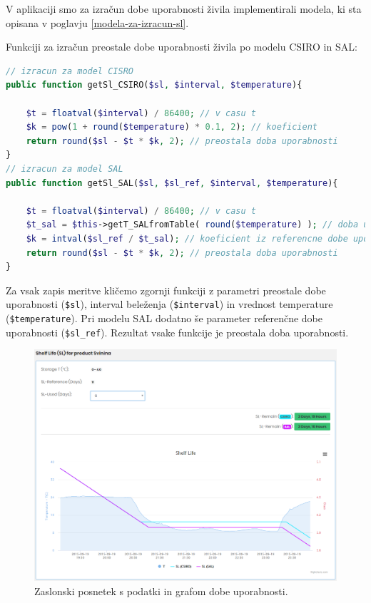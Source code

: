 \documentclass[a4paper, 12pt]{book}
\begin{document}
V aplikaciji smo za izračun dobe uporabnosti živila implementirali modela, ki sta opisana v poglavju \ref{modela-za-izracun-sl}.


Funkciji za izračun preostale dobe uporabnosti živila po modelu CSIRO in SAL:

\begin{lstlisting}[language=PHP, style=mystyle]
// izracun za model CISRO
public function getSl_CSIRO($sl, $interval, $temperature){

    $t = floatval($interval) / 86400; // v casu t
    $k = pow(1 + round($temperature) * 0.1, 2); // koeficient
    return round($sl - $t * $k, 2); // preostala doba uporabnosti
}
// izracun za model SAL
public function getSl_SAL($sl, $sl_ref, $interval, $temperature){

    $t = floatval($interval) / 86400; // v casu t
    $t_sal = $this->getT_SALfromTable( round($temperature) ); // doba uporabnosti pri temperaturi T prebrana iz tabele SAL
    $k = intval($sl_ref / $t_sal); // koeficient iz referencne dobe uporabnosti deljeno z $t_sal
    return round($sl - $t * $k, 2); // preostala doba uporabnosti
}
\end{lstlisting}

Za vsak zapis meritve kličemo zgornji funkciji z parametri preostale dobe uporabnosti (\verb=$sl=), interval beleženja (\verb=$interval=) in vrednost temperature (\verb=$temperature=). Pri modelu SAL dodatno še parameter referenčne dobe uporabnosti (\verb=$sl_ref=). Rezultat vsake funkcije je preostala doba uporabnosti.

\begin{figure}[h]
\begin{center}
\includegraphics[width=\textwidth]{slike/record_page_33.png}
\end{center}
\caption{Zaslonski posnetek s podatki in grafom dobe uporabnosti.}
\label{ss-record-page-sl}
\end{figure}
\end{document}
